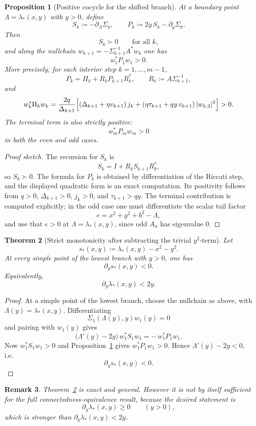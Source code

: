 \documentclass[11pt]{article}
\newtheorem{theorem}{Theorem}[section]
\newtheorem{proposition}[theorem]{Proposition}
\newtheorem{remark}[theorem]{Remark}
\begin{document}
\begin{proposition}[Positive cocycle for the shifted branch]\label{prop:Ppositive}
At a boundary point \(\Lambda=\lambda_*(x,y)\) with \(y>0\), define
\[
S_k\coloneqq -\partial_\Lambda \Sigma_k,
\qquad
P_k\coloneqq 2y\,S_k-\partial_y\Sigma_k.
\]
Then
\[
S_k\succ 0
\qquad\text{for all }k,
\]
and along the nullchain \(w_{k+1}=-\Sigma_{k+1}^{-1}A^*w_k\) one has
\[
w_1^*P_1w_1>0.
\]
More precisely, for each interior step \(k=1,\dots,m-1\),
\[
P_k=\Pi_k+R_kP_{k+1}R_k^*,
\qquad
R_k\coloneqq A\Sigma_{k+1}^{-1},
\]
and
\[
w_k^*\Pi_kw_k
=
\frac{2q}{\Delta_{k+1}}
\Bigl[
(\Delta_{k+1}+\eta v_{k+1})\,j_k
+
(\eta\tau_{k+1}+qy\,v_{k+1})\,|w_{k,2}|^2
\Bigr]
>0.
\]
The terminal term is also strictly positive:
\[
w_m^*P_mw_m>0
\]
in both the even and odd cases.
\end{proposition}

\begin{proof}[Proof sketch]
The recursion for \(S_k\) is
\[
S_k=I+R_kS_{k+1}R_k^*,
\]
so \(S_k\succ 0\). The formula for \(P_k\) is obtained by differentiation of the Riccati step,
and the displayed quadratic form is an exact computation. Its positivity follows from
\(q>0\), \(\Delta_{k+1}>0\), \(j_k>0\), and \(\tau_{k+1}>qy\). The terminal contribution is
computed explicitly; in the odd case one must differentiate the scalar tail factor
\[
e=x^2+y^2+b^2-\Lambda,
\]
and use that \(e>0\) at \(\Lambda=\lambda_*(x,y)\), since odd \(A_n\) has eigenvalue \(0\).
\end{proof}

\begin{theorem}[Strict monotonicity after subtracting the trivial \(y^2\)-term]
\label{thm:shifted-decreasing}
Let
\[
s_*(x,y)\coloneqq \lambda_*(x,y)-x^2-y^2.
\]
At every simple point of the lowest branch with \(y>0\), one has
\[
\partial_y s_*(x,y)<0.
\]
Equivalently,
\[
\partial_y\lambda_*(x,y)<2y.
\]
\end{theorem}

\begin{proof}
At a simple point of the lowest branch, choose the nullchain as above, with
\(\Lambda(y)=\lambda_*(x,y)\). Differentiating
\[
\Sigma_1(\Lambda(y),y)w_1(y)=0
\]
and pairing with \(w_1(y)\) gives
\[
\bigl(\Lambda'(y)-2y\bigr)\,w_1^*S_1w_1
=
-\,w_1^*P_1w_1.
\]
Now \(w_1^*S_1w_1>0\) and Proposition~\ref{prop:Ppositive} gives
\(w_1^*P_1w_1>0\). Hence \(\Lambda'(y)-2y<0\), i.e.
\[
\partial_y s_*(x,y)<0.
\]
\end{proof}

\begin{remark}
Theorem~\ref{thm:shifted-decreasing} is exact and general. However it is not by itself
sufficient for the full connectedness-equivalence result, because the desired statement is
\[
\partial_y\lambda_*(x,y)\ge 0
\qquad (y>0),
\]
which is stronger than \(\partial_y\lambda_*(x,y)<2y\).
\end{remark}
\end{document}
